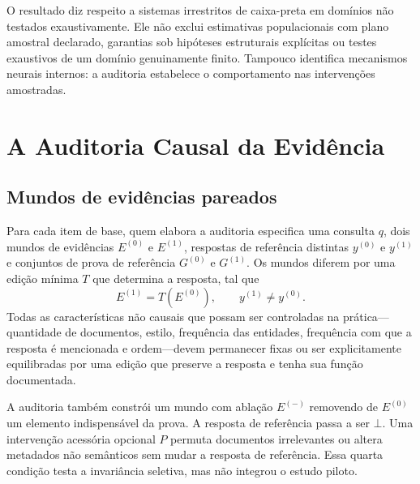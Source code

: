 \documentclass[10pt,twocolumn]{article}
\newcommand{\botans}{\bot}
\begin{document}
O resultado diz respeito a sistemas irrestritos de caixa-preta em domínios não testados exaustivamente. Ele não exclui estimativas populacionais com plano amostral declarado, garantias sob hipóteses estruturais explícitas ou testes exaustivos de um domínio genuinamente finito. Tampouco identifica mecanismos neurais internos: a auditoria estabelece o comportamento nas intervenções amostradas.

\section{A Auditoria Causal da Evidência}

\subsection{Mundos de evidências pareados}

Para cada item de base, quem elabora a auditoria especifica uma consulta $q$, dois mundos de evidências $E^{(0)}$ e $E^{(1)}$, respostas de referência distintas $y^{(0)}$ e $y^{(1)}$ e conjuntos de prova de referência $G^{(0)}$ e $G^{(1)}$. Os mundos diferem por uma edição mínima $T$ que determina a resposta, tal que
\begin{equation}
 E^{(1)}=T(E^{(0)}), \qquad y^{(1)}\neq y^{(0)}.
\end{equation}
Todas as características não causais que possam ser controladas na prática---quantidade de documentos, estilo, frequência das entidades, frequência com que a resposta é mencionada e ordem---devem permanecer fixas ou ser explicitamente equilibradas por uma edição que preserve a resposta e tenha sua função documentada.

A auditoria também constrói um mundo com ablação $E^{(-)}$ removendo de $E^{(0)}$ um elemento indispensável da prova. A resposta de referência passa a ser $\botans$. Uma intervenção acessória opcional $P$ permuta documentos irrelevantes ou altera metadados não semânticos sem mudar a resposta de referência. Essa quarta condição testa a invariância seletiva, mas não integrou o estudo piloto.
\end{document}
